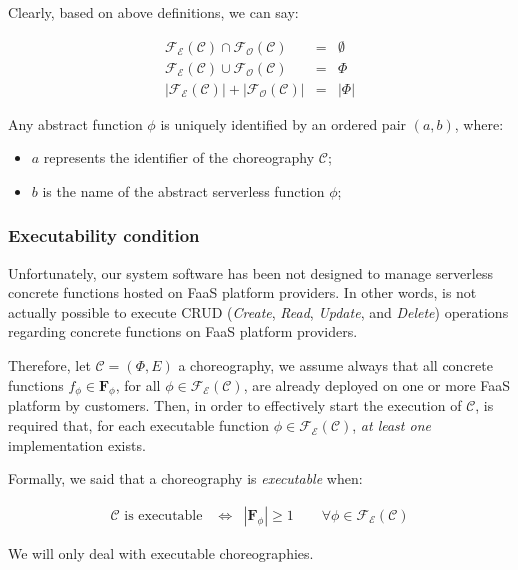 \documentclass[12pt,a4paper]{report}
\begin{document}
Clearly, based on above definitions, we can say: 

\begin{eqnarray}
	\mathscr{F_E}(\mathcal{C}) \cap \mathscr{F_O}(\mathcal{C}) & = & \emptyset \\
	\mathscr{F_E}(\mathcal{C}) \cup \mathscr{F_O}(\mathcal{C}) & = & \Phi \\
	|\mathscr{F_E}(\mathcal{C})| + |\mathscr{F_O}(\mathcal{C})| &=& |\Phi| 
\end{eqnarray}

Any abstract function $\phi$ is uniquely identified by an ordered pair $(a, b)$, where:
\begin{itemize}
	\item $a$ represents the identifier of the choreography $\mathcal{C}$;
	\item $b$ is the name of the abstract serverless function $\phi$;
\end{itemize}



\subsubsection{Executability condition}

Unfortunately, our system software has been not designed to manage serverless concrete functions hosted on FaaS platform providers. In other words, is not actually possible to execute CRUD (\textit{Create}, \textit{Read}, \textit{Update}, and \textit{Delete}) operations regarding concrete functions on FaaS platform providers.

Therefore, let $\mathcal{C} = (\Phi,E)$ a choreography, we assume always that all concrete functions $f_{\phi} \in \textbf{F}_{\phi}$, for all $\phi \in \mathscr{F_E}(\mathcal{C})$, are already deployed on one or more FaaS platform by customers. Then, in order to effectively start the execution of $\mathcal{C}$, is required that, for each executable function $\phi \in \mathscr{F_E}(\mathcal{C})$, \textit{at least one} implementation exists.

Formally, we said that a choreography is \textit{executable} when: 

\begin{eqnarray}
	\label{eqn:SchedulabilityConditionOne}
	\mathcal{C} \text{ is executable } & \Leftrightarrow & |\textbf{F}_{\phi}| \geq 1 \qquad \forall \phi \in \mathscr{F_E}(\mathcal{C})
\end{eqnarray}

We will only deal with executable choreographies.
\end{document}
